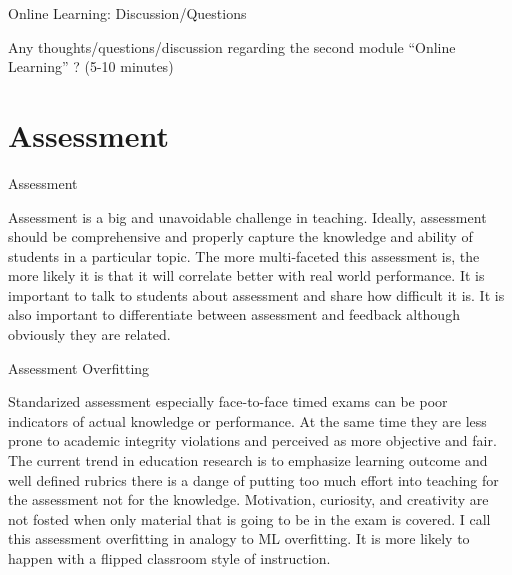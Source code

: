 \documentclass[12pt]{beamer}
\begin{document}
\begin{frame}{Online Learning: Discussion/Questions}

  Any thoughts/questions/discussion regarding the second module ``Online Learning'' ? (5-10 minutes) 
  
\end{frame}


\section{Assessment}

%

\begin{frame}{Assessment}

  Assessment is a big and unavoidable challenge in teaching.
  Ideally, assessment should be comprehensive and properly capture
  the knowledge and ability of students in a particular topic. The more
  multi-faceted this assessment is, the more likely it is that it will
  correlate better with real world performance. It is important to talk
  to students about assessment and share how difficult it is. It is also
  important to differentiate between assessment and feedback although
  obviously they are related. 

  
\end{frame}


\begin{frame}{Assessment Overfitting}

  Standarized assessment especially face-to-face timed exams can be
  poor indicators of actual knowledge or performance. At the same time
  they are less prone to academic integrity violations and perceived
  as more objective and fair. The current trend in education research
  is to emphasize learning outcome and well defined rubrics there is a
  dange of putting too much effort into teaching for the assessment
  not for the knowledge.  Motivation, curiosity, and creativity are
  not fosted when only material that is going to be in the exam is
  covered. I call this assessment overfitting in analogy to ML
  overfitting. It is more likely to happen with a flipped classroom
  style of instruction.

\end{frame}
\end{document}
